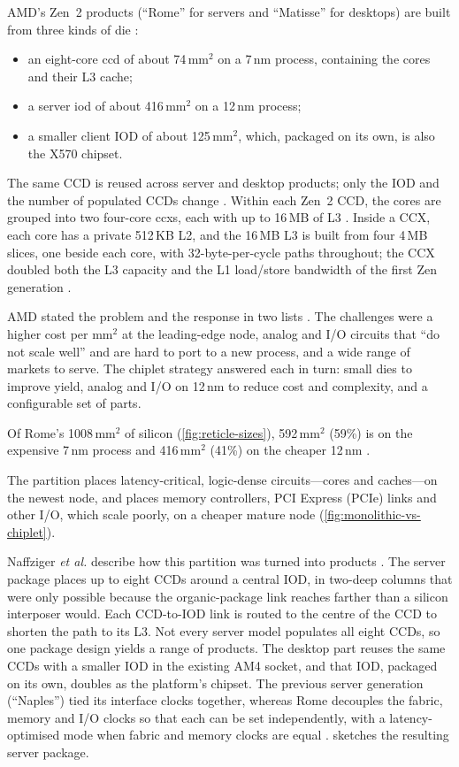 AMD's Zen~2 products (``Rome'' for servers and ``Matisse'' for desktops) are built from three kinds of die \cite{naffziger2020chiplet,suggs2019zen2}:
\begin{itemize}
  \item an eight-core \gls{ccd} of about 74\,mm$^2$ on a 7\,nm process, containing the cores and their L3 cache;
  \item a server \gls{iod} of about 416\,mm$^2$ on a 12\,nm process;
  \item a smaller client IOD of about 125\,mm$^2$, which, packaged on its own, is also the X570 chipset.
\end{itemize}
The same CCD is reused across server and desktop products; only the IOD and the number of populated CCDs change \cite{naffziger2020chiplet}. Within each Zen~2 CCD, the cores are grouped into two four-core \glspl{ccx}, each with up to 16\,MB of L3 \cite{suggs2019zen2}. Inside a CCX, each core has a private 512\,KB L2, and the 16\,MB L3 is built from four 4\,MB slices, one beside each core, with 32-byte-per-cycle paths throughout; the CCX doubled both the L3 capacity and the L1 load/store bandwidth of the first Zen generation \cite[slide~12]{suggs2019zen2}.

AMD stated the problem and the response in two lists \cite[slide~13]{suggs2019zen2}. The challenges were a higher cost per mm$^2$ at the leading-edge node, analog and I/O circuits that ``do not scale well'' and are hard to port to a new process, and a wide range of markets to serve. The chiplet strategy answered each in turn: small dies to improve yield, analog and I/O on 12\,nm to reduce cost and complexity, and a configurable set of parts.

Of Rome's 1008\,mm$^2$ of silicon (\cref{fig:reticle-sizes}), 592\,mm$^2$ (59\%) is on the expensive 7\,nm process and 416\,mm$^2$ (41\%) on the cheaper 12\,nm \cite{naffziger2020chiplet}.

The partition places latency-critical, logic-dense circuits---cores and caches---on the newest node, and places memory controllers, PCI Express (PCIe) links and other I/O, which scale poorly, on a cheaper mature node (\cref{fig:monolithic-vs-chiplet}).

Naffziger \emph{et al.} describe how this partition was turned into products \cite{naffziger2020chiplet}. The server package places up to eight CCDs around a central IOD, in two-deep columns that were only possible because the organic-package link reaches farther than a silicon interposer would. Each CCD-to-IOD link is routed to the centre of the CCD to shorten the path to its L3. Not every server model populates all eight CCDs, so one package design yields a range of products. The desktop part reuses the same CCDs with a smaller IOD in the existing AM4 socket, and that IOD, packaged on its own, doubles as the platform's chipset. The previous server generation (``Naples'') tied its interface clocks together, whereas Rome decouples the fabric, memory and I/O clocks so that each can be set independently, with a latency-optimised mode when fabric and memory clocks are equal \cite{naffziger2020chiplet}.  sketches the resulting server package.

